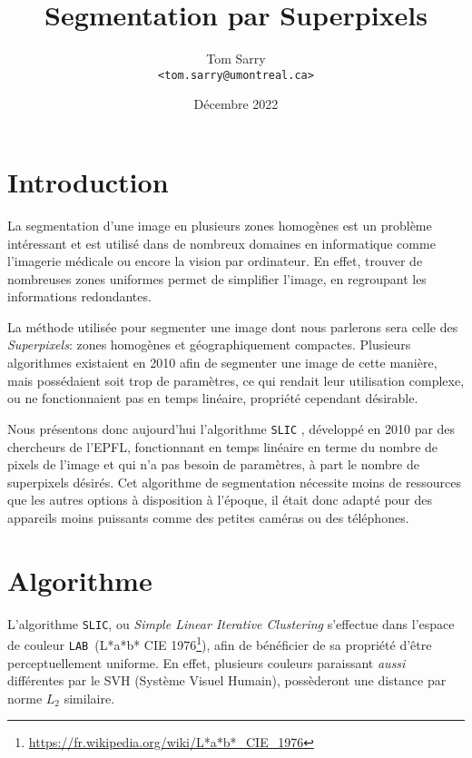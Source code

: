 \documentclass[12pt]{article}
\title{\vspace{-1cm} Segmentation par Superpixels}
\author{
  Tom Sarry \\
  \texttt{<tom.sarry@umontreal.ca>}
}
\date{D\'ecembre 2022}
\newcommand{\lab}{\texttt{LAB}}
\begin{document}
\maketitle


\section{Introduction}

La segmentation d'une image en plusieurs zones homog\`enes est un probl\`eme int\'eressant
et est utilis\'e dans de nombreux domaines en informatique comme l'imagerie m\'edicale ou encore la vision par ordinateur.
En effet, trouver de nombreuses zones uniformes permet de simplifier l'image, en regroupant les informations redondantes.

La m\'ethode utilis\'ee pour segmenter une image dont nous parlerons sera celle des \textit{Superpixels}:
zones homog\`enes et g\'eographiquement compactes.
Plusieurs algorithmes existaient en 2010 afin de segmenter une image de cette mani\`ere, mais poss\'edaient soit
trop de param\`etres, ce qui rendait leur utilisation complexe, ou ne fonctionnaient pas en temps lin\'eaire, propri\'et\'e cependant d\'esirable.

Nous pr\'esentons donc aujourd'hui l'algorithme \texttt{SLIC} \cite*{slic}, d\'evelopp\'e en 2010 par des chercheurs de l'EPFL,
fonctionnant en temps lin\'eaire en terme du nombre de pixels de l'image
et qui n'a pas besoin de param\`etres, \`a part le nombre de superpixels d\'esir\'es.
Cet algorithme de segmentation n\'ecessite moins de ressources que les autres options \`a disposition \`a l'\'epoque,
il \'etait donc adapt\'e pour des appareils moins puissants comme des petites cam\'eras ou des t\'el\'ephones.

\section{Algorithme}

L'algorithme \texttt{SLIC}, ou \textit{Simple Linear Iterative Clustering} s'effectue dans l'espace
de couleur \lab\ (L*a*b* CIE 1976\footnote{\url{https://fr.wikipedia.org/wiki/L*a*b*_CIE_1976}}),
afin de b\'en\'eficier de sa propri\'et\'e d'\^etre perceptuellement uniforme.
En effet, plusieurs couleurs paraissant \textit{aussi} diff\'erentes par le SVH (Syst\`eme Visuel Humain),
poss\`ederont une distance par norme $L_2$ similaire.
\end{document}
